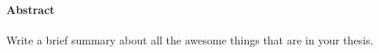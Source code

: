 \null\vfill

{\Huge \textbf{Abstract}} \\ \\

Write a brief summary about all the awesome things that are in your thesis.


\vfill\vfill\vfill\vfill\null